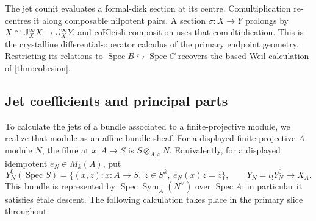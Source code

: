 \documentclass[11pt,a4paper]{article}
\numberwithin{algorithm}{section}
\numberwithin{equation}{section}
\theoremstyle{definition}
\theoremstyle{remark}
\theoremstyle{plain}
\newcommand{\Sym}{\operatorname{Sym}}
\theoremstyle{definition}
\theoremstyle{plain}
\begin{document}
The jet counit evaluates a formal-disk section at its centre.
Comultiplication re-centres it along composable nilpotent
pairs. A section $\sigma:X\to Y$ prolongs by
$X\cong\mathbb J_X^\infty X\to\mathbb J_X^\infty Y$,
and coKleisli composition uses that comultiplication.
This is the crystalline differential-operator calculus of
the primary endpoint geometry. Restricting its relations to
$\operatorname{Spec}B\hookrightarrow\operatorname{Spec}C$
recovers the based-Weil calculation of \cref{thm:cohesion}.


\subsection{Jet coefficients and principal parts}
\label{sec:primary-jet-coefficients}
To calculate the jets of a bundle associated to a finite-projective
module, we realize that module as an affine bundle sheaf. For a displayed
finite-projective $A$-module $N$, the fibre at $x:A\to S$
is $S\otimes_{A,x}N$. Equivalently, for a displayed idempotent
$e_N\in M_k(A)$, put
\[
 Y_N^0(\operatorname{Spec}S)
 =\{(x,z):x:A\to S,\ z\in S^k,\ e_N(x)z=z\},
 \qquad Y_N=\iota_!Y_N^0\longrightarrow X_A.
\]
This bundle is represented by
$\operatorname{Spec}\Sym_A(N^\vee)$ over $\operatorname{Spec}A$;
in particular it satisfies \'etale descent.  The following
calculation takes place in the primary slice throughout.
\end{document}
